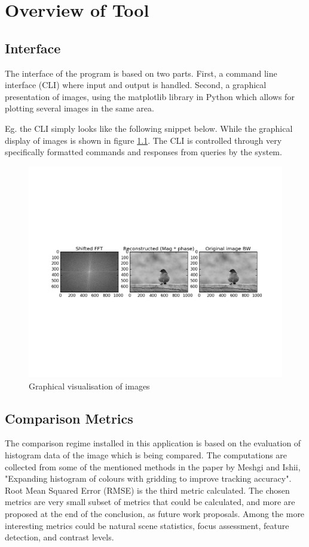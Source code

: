 \chapter{Overview of Tool}\label{sec:swinstruct}

\section{Interface}
The interface of the program is based on two parts.  First, a command line
interface (CLI) where input and output is handled.  Second, a graphical
presentation of images, using the matplotlib library in Python which allows for
plotting several images in the same area.

Eg. the CLI simply looks like the following snippet below.  While the graphical
display of images is shown in figure \ref{fig:gui_display}.
The CLI is controlled through very specifically formatted commands and responses
from queries by the system.

\begin{figure}[h]
	\center
	\includegraphics[width={1\linewidth},trim={50px 235px 50px 230px},clip]{pics/gui_display}
	\caption{Graphical visualisation of images}\label{fig:gui_display}
\end{figure}


\section{Comparison Metrics}
The comparison regime installed in this application is based on the evaluation
of histogram data of the image which is being compared.  The computations are
collected from some of the mentioned methods in the paper by Meshgi and Ishii,
"Expanding histogram of colours with gridding to improve tracking
accuracy"\cite{histMetrics}.  Root Mean Squared Error (RMSE) is the third metric
calculated. The chosen metrics are very small subset of metrics that could be
calculated, and more are proposed at the end of the conclusion, as future work
proposals. Among the more interesting metrics could be natural scene statistics,
focus assessment, feature detection, and contrast levels.

